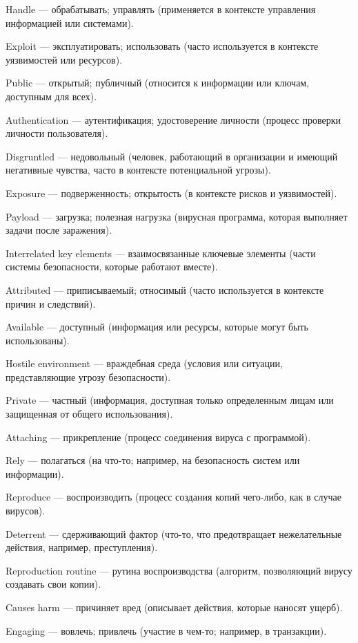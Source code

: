 	\par Handle — обрабатывать; управлять (применяется в контексте управления информацией или системами).
	\par Exploit — эксплуатировать; использовать (часто используется в контексте уязвимостей или ресурсов).
	\par Public — открытый; публичный (относится к информации или ключам, доступным для всех).
	\par Authentication — аутентификация; удостоверение личности (процесс проверки личности пользователя).
	\par Disgruntled — недовольный (человек, работающий в организации и имеющий негативные чувства, часто в контексте потенциальной угрозы).
	\par Exposure — подверженность; открытость (в контексте рисков и уязвимостей).
	\par Payload — загрузка; полезная нагрузка (вирусная программа, которая выполняет задачи после заражения).
	\par Interrelated key elements — взаимосвязанные ключевые элементы (части системы безопасности, которые работают вместе).
	\par Attributed — приписываемый; относимый (часто используется в контексте причин и следствий).
	\par Available — доступный (информация или ресурсы, которые могут быть использованы).
	\par Hostile environment — враждебная среда (условия или ситуации, представляющие угрозу безопасности).
	\par Private — частный (информация, доступная только определенным лицам или защищенная от общего использования).
	\par Attaching — прикрепление (процесс соединения вируса с программой).
	\par Rely — полагаться (на что-то; например, на безопасность систем или информации).
	\par Reproduce — воспроизводить (процесс создания копий чего-либо, как в случае вирусов).
	\par Deterrent — сдерживающий фактор (что-то, что предотвращает нежелательные действия, например, преступления).
	\par Reproduction routine — рутина воспроизводства (алгоритм, позволяющий вирусу создавать свои копии).
	\par Causes harm — причиняет вред (описывает действия, которые наносят ущерб).
	\par Engaging — вовлечь; привлечь (участие в чем-то; например, в транзакции).
